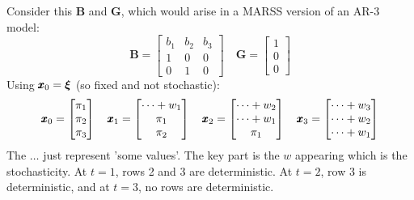 \documentclass[]{article}
\def\xixi{\mbox{\boldmath $\xi$}}
\def\UPS{\mbox{\boldmath $\Upsilon$}}
\def\BB{\mbox{$\mathbf B$}}	\def\bb{\mbox{$\mathbf b$}} \def\Bb{\mbox{$\mathbf J$}} \def\Ba{\mbox{$\mathbf L$}} \def\Bm{\UPS}
\def\GG{\mbox{$\mathbf G$}}	\def\gg{\mbox{$\mathbf g$}}
\begin{document}
Consider this $\BB$ and $\GG$, which would arise in a MARSS version of an AR-3 model:
\begin{equation}
\BB=\begin{bmatrix}
b_1&b_2&b_3\\
1&0&0\\
0&1&0\end{bmatrix}
\quad
\GG=\begin{bmatrix}
1\\
0\\
0\end{bmatrix}
\end{equation}
Using $\xx_0=\xixi$ (so fixed and not stochastic):
\begin{equation}
\mbox{$\pmb{x}$}_0=\begin{bmatrix}
\pi_1\\
\pi_2\\
\pi_3
\end{bmatrix}
\quad
\mbox{$\pmb{x}$}_1=\begin{bmatrix}
\dots+w_1\\
\pi_1\\
\pi_2
\end{bmatrix}
\quad
\mbox{$\pmb{x}$}_2=\begin{bmatrix}
\dots+w_2\\
\dots+w_1\\
\pi_1\end{bmatrix}
\quad
\mbox{$\pmb{x}$}_3=\begin{bmatrix}
\dots+w_3\\
\dots+w_2\\
\dots+w_1
\end{bmatrix}
\end{equation}
The $\dots$ just represent 'some values'.  The key part is the $w$ appearing which is the stochasticity.  At $t=1$, rows 2 and 3 are deterministic.  At $t=2$, row 3 is deterministic, and at $t=3$, no rows are deterministic.
\end{document}
